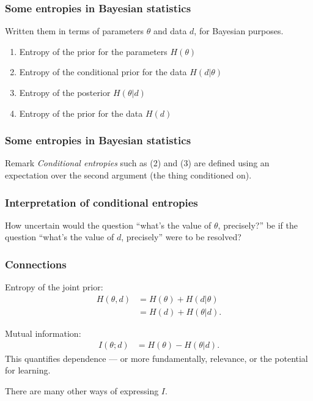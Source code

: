 \documentclass{beamer}
\begin{document}
\begin{frame}
\frametitle{Some entropies in Bayesian statistics}
Written them in terms of parameters $\theta$ and data
$d$, for Bayesian purposes.

\begin{enumerate}
\item<2-> Entropy of the prior for the parameters $H(\theta)$
\item<3-> Entropy of the conditional prior for the data $H(d | \theta)$
\item<4-> Entropy of the posterior $H(\theta | d)$
\item<5-> Entropy of the prior for the data $H(d)$
\end{enumerate}

\end{frame}


\begin{frame}
\frametitle{Some entropies in Bayesian statistics}

\begin{block}{Remark}
{\em Conditional entropies} such as (2) and (3)
are defined using an expectation over the second argument
(the thing conditioned on).
\end{block}

\end{frame}

\begin{frame}
\frametitle{Interpretation of conditional entropies}

How uncertain would the question ``what's the value of $\theta$,
precisely?'' be if the question ``what's the value of $d$, precisely''
were to be resolved?

\end{frame}



\begin{frame}
\frametitle{Connections}

Entropy of the joint prior:
\begin{align}
H(\theta, d) &= H(\theta) + H(d | \theta) \\
                          &= H(d) + H(\theta | d).
\end{align}

Mutual information:
\begin{align}
I(\theta; d) &= H(\theta) - H(\theta | d).
\end{align}
This quantifies dependence --- or more fundamentally,
relevance, or the potential for learning.


{\tiny There are many other ways of expressing $I$.}

\end{frame}
\end{document}
